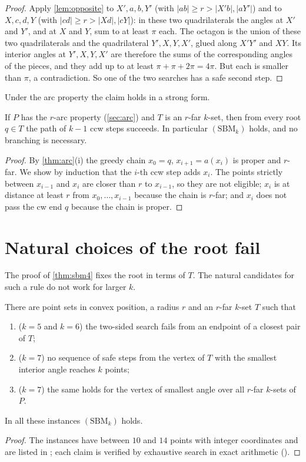 \begin{proof}
Apply \cref{lem:opposite} to $X',a,b,Y'$ (with $|ab|\ge r>|X'b|,|aY'|$) and to
$X,c,d,Y$ (with $|cd|\ge r>|Xd|,|cY|$): in these two quadrilaterals the angles
at $X'$ and $Y'$, and at $X$ and $Y$, sum to at least $\pi$ each. The octagon
is the union of these two quadrilaterals and the quadrilateral
$Y',X,Y,X'$, glued along $X'Y'$ and $XY$. Its interior angles at
$Y',X,Y,X'$ are therefore the sums of the corresponding angles of the pieces,
and they add up to at least $\pi+\pi+2\pi=4\pi$. But each is smaller than
$\pi$, a contradiction. So one of the two searches has a safe second step.
\end{proof}

Under the arc property the claim holds in a
strong form.

\begin{proposition}\label{prop:sbmarc}
If $P$ has the $r$-arc property (\cref{sec:arc}) and $T$ is an $r$-far
$k$-set, then from every root $q\in T$ the path of $k-1$ ccw steps
succeeds. In particular $(\mathrm{SBM}_k)$ holds, and no branching is
necessary.
\end{proposition}
\begin{proof}
By \cref{thm:arc}(i) the greedy chain $x_0=q$, $x_{i+1}=a(x_i)$ is proper and
$r$-far. We show by induction that the $i$-th ccw step adds $x_i$. The points
strictly between $x_{i-1}$ and $x_i$ are closer than $r$ to $x_{i-1}$, so they
are not eligible; $x_i$ is at distance at least $r$ from $x_0,\dots,x_{i-1}$
because the chain is $r$-far; and $x_i$ does not pass the cw end $q$ because
the chain is proper.
\end{proof}

\section{Natural choices of the root fail}
The proof of \cref{thm:sbm4} fixes the root in terms of $T$. The natural
candidates for such a rule do not work for larger $k$.

\begin{proposition}\label{prop:rootrules}
There are point sets in convex position, a radius $r$ and an $r$-far $k$-set
$T$ such that
\begin{enumerate}[label=(\alph*),itemsep=1pt,topsep=2pt]
\item ($k=5$ and $k=6$) the two-sided search fails from an endpoint of a
closest pair of $T$;
\item ($k=7$) no sequence of safe steps from the vertex of $T$ with the
smallest interior angle reaches $k$ points;
\item ($k=7$) the same holds for the vertex of smallest angle over all $r$-far
$k$-sets of $P$.
\end{enumerate}
In all these instances $(\mathrm{SBM}_k)$ holds.
\end{proposition}
\begin{proof}
The instances have between $10$ and $14$ points with integer coordinates and
are listed in ; each claim is verified
by exhaustive search in exact arithmetic ().
\end{proof}

